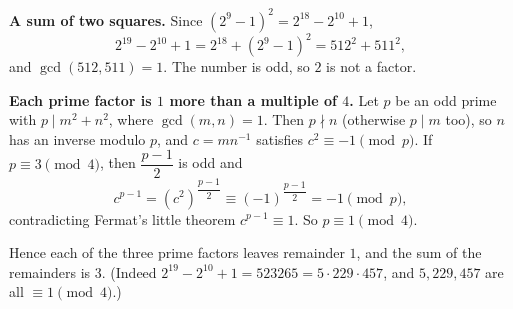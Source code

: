 \textbf{A sum of two squares.} Since $(2^9-1)^2=2^{18}-2^{10}+1$,
\[
2^{19}-2^{10}+1=2^{18}+(2^9-1)^2=512^2+511^2 ,
\]
and $\gcd(512,511)=1$. The number is odd, so $2$ is not a factor.

\textbf{Each prime factor is $1$ more than a multiple of $4$.} Let $p$ be an odd prime with $p\mid m^2+n^2$, where $\gcd(m,n)=1$. Then $p\nmid n$ (otherwise $p\mid m$ too), so $n$ has an inverse modulo $p$, and $c=mn^{-1}$ satisfies $c^2\equiv-1\pmod p$. If $p\equiv3\pmod4$, then $\dfrac{p-1}{2}$ is odd and
\[
c^{p-1}=\left(c^2\right)^{\dfrac{p-1}{2}}\equiv(-1)^{\dfrac{p-1}{2}}=-1\pmod p,
\]
contradicting Fermat's little theorem $c^{p-1}\equiv1$. So $p\equiv1\pmod4$.

Hence each of the three prime factors leaves remainder $1$, and the sum of the remainders is $\boxed{3}$. (Indeed $2^{19}-2^{10}+1=523265=5\cdot229\cdot457$, and $5,229,457$ are all $\equiv1\pmod4$.)
